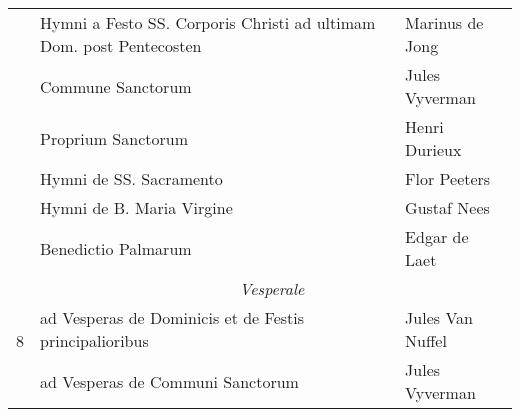 \begin{table}[ht]
\begin{tabular}{@{}cll@{}}
                     & Hymni a Festo SS. Corporis Christi ad ultimam Dom. post Pentecosten    & Marinus de Jong              \\
                     & Commune Sanctorum                                                      & Jules Vyverman               \\
                     & Proprium Sanctorum                                                     & Henri Durieux                \\
                     & Hymni de SS. Sacramento                                                & Flor Peeters                 \\
                     & Hymni de B. Maria Virgine                                              & Gustaf Nees                  \\
                     & Benedictio Palmarum                                                    & Edgar de Laet                \\ \midrule
\multirow{3}{*}{8}   & \multicolumn{2}{c}{\textit{Vesperale}}                                                                \\
                     & ad Vesperas de Dominicis et de Festis principalioribus                 & Jules Van Nuffel             \\
                     & ad Vesperas de Communi Sanctorum                                       & Jules Vyverman               \\ \bottomrule
\end{tabular}
\end{table}

\vspace*{\fill}
\restoregeometry
